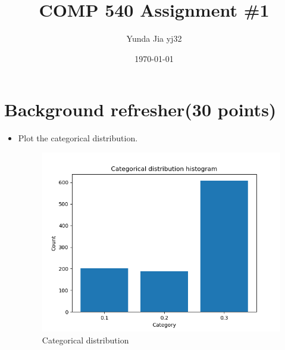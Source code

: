 \documentclass{article}
\title{COMP 540 Assignment \#1}
\author{Yunda Jia yj32}
\date{\today}
\begin{document}
\maketitle

\section{Background refresher(30 points)}
\begin{itemize}
	\item Plot the categorical distribution.\\
\begin{figure}[h!]
	\centering
	\includegraphics[scale = 0.5]{Categorical_distribution.png}
	\caption{Categorical distribution}
\end{figure}


\end{itemize}
\end{document}
